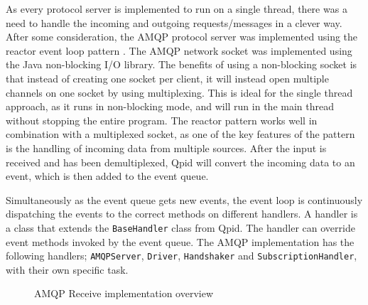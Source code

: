 As every protocol server is implemented to run on a single thread, there was a need to handle the incoming and outgoing requests/messages in a clever way. After some consideration, the AMQP protocol server was implemented using the reactor event loop pattern \cite{event-loop}. 
The AMQP network socket was implemented using the Java non-blocking I/O library. The benefits of using a non-blocking socket is that instead of creating one socket per client, it will instead open multiple channels on one socket by using multiplexing. This is ideal for the single thread approach, as it runs in non-blocking mode, and will run in the main thread without stopping the entire program. The reactor pattern works well in combination with a multiplexed socket, as one of the key features of the pattern is the handling of incoming data from multiple sources. After the input is received and has been demultiplexed, Qpid will convert the incoming data to an event, which is then added to the event queue.

Simultaneously as the event queue gets new events, the event loop is continuously dispatching the events to the correct methods on different handlers. A handler is a class that extends the \verb!BaseHandler! class from Qpid. The handler can override event methods invoked by the event queue. The AMQP implementation has the following handlers; \verb!AMQPServer!, \verb!Driver!, \verb!Handshaker! and \verb!SubscriptionHandler!, with their own specific task.

\begin{center}
  \begin{figure}[ht!]
    \caption{AMQP Receive implementation overview}
    \label{fig:amqp_recv}
  \end{figure}
\end{center}

